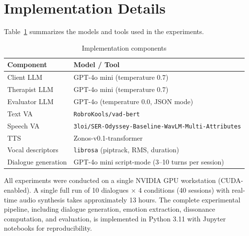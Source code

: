 \section{Implementation Details}

Table~\ref{tab:implementation} summarizes the models and tools used in the experiments.

\begin{table}[hbt!]
\centering
\caption{Implementation components}
\begin{tabular}{ll}
\hline
\textbf{Component} & \textbf{Model / Tool} \\ \hline
Client LLM & GPT-4o mini (temperature 0.7) \\
Therapist LLM & GPT-4o mini (temperature 0.7) \\
Evaluator LLM & GPT-4o (temperature 0.0, JSON mode) \\
Text VA & \texttt{RobroKools/vad-bert} \\
Speech VA & \texttt{3loi/SER-Odyssey-Baseline-WavLM-Multi-Attributes} \\
TTS & Zonos-v0.1-transformer \\
Vocal descriptors & \texttt{librosa} (piptrack, RMS, duration) \\
Dialogue generation & GPT-4o mini script-mode (3--10 turns per session) \\
\hline
\end{tabular}
\label{tab:implementation}
\end{table}

All experiments were conducted on a single NVIDIA GPU workstation (CUDA-enabled). A single full run of 10 dialogues $\times$ 4 conditions (40 sessions) with real-time audio synthesis takes approximately 13 hours. The complete experimental pipeline, including dialogue generation, emotion extraction, dissonance computation, and evaluation, is implemented in Python 3.11 with Jupyter notebooks for reproducibility.






